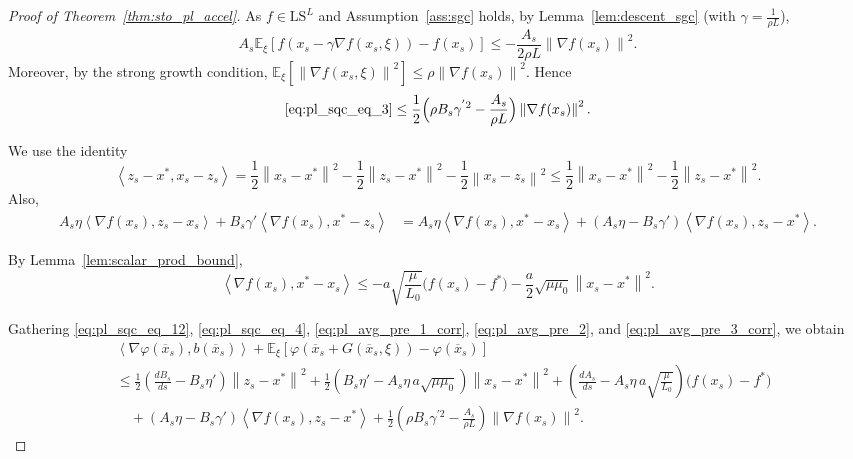 \documentclass{article}
\newcommand{\bpar}[1]{\left(#1\right)}
\newcommand{\norm}[1]{\left\lVert#1\right\rVert}
\newcommand{\dotprod}[1]{\left< #1\right>}
\newcommand{\ls}{\text{LS}^{L}}
\theoremstyle{plain}
\theoremstyle{definition}
\theoremstyle{remark}
\begin{document}
\begin{proof}[Proof of Theorem~\ref{thm:sto_pl_accel}]
As $f \in \ls$ and Assumption~\ref{ass:sgc} holds, by Lemma~\ref{lem:descent_sgc} (with $\gamma=\frac{1}{\rho L}$),
\[
A_s\mathbb{E}_{\xi}\!\left[f(x_s - \gamma \nabla f(x_s,\xi)) - f(x_s)\right]
\le -\frac{A_s}{2\rho L}\norm{\nabla f(x_s)}^2.
\]
Moreover, by the strong growth condition,
$\mathbb{E}_{\xi}\!\left[\norm{\nabla f(x_s,\xi)}^2\right]\le \rho \norm{\nabla f(x_s)}^2$. Hence
\begin{equation}\label{eq:pl_avg_pre_1_corr}
\eqref{eq:pl_sqc_eq_3}
\le \frac{1}{2}\Bigl(\rho B_s \gamma^{'2} - \frac{A_s}{\rho L}\Bigr)\norm{\nabla f(x_s)}^2.
\end{equation}

We use the identity
\begin{equation}\label{eq:pl_avg_pre_2}
\dotprod{z_s-x^\ast,x_s - z_s}
= \frac{1}{2}\norm{x_s-x^\ast}^2 -\frac{1}{2}\norm{z_s-x^\ast}^2-\frac{1}{2}\norm{x_s-z_s}^2
\le\frac{1}{2}\norm{x_s-x^\ast}^2 -\frac{1}{2}\norm{z_s-x^\ast}^2.
\end{equation}
Also,
\begin{align}\label{eq:pl_avg_pre_3_corr}
A_s \eta \dotprod{ \nabla f(x_s) ,z_s-x_s} +  B_s\gamma' \dotprod{\nabla f(x_s),x^\ast - z_s}
&= A_s \eta \dotprod{ \nabla f(x_s) ,x^\ast-x_s}
+ \bpar{A_s\eta - B_s \gamma'} \dotprod{ \nabla f(x_s) ,z_s-x^\ast}.
\end{align}

By Lemma~\ref{lem:scalar_prod_bound},
\[
\dotprod{ \nabla f(x_s) ,x^\ast-x_s}
\le  -a \sqrt{\frac{\mu}{L_0}}\bigl(f(x_s)-f^\ast\bigr)
      - \frac{a}{2}\sqrt{\mu\mu_0}\norm{x_s-x^\ast}^2.
\]

Gathering \eqref{eq:pl_sqc_eq_12}, \eqref{eq:pl_sqc_eq_4}, \eqref{eq:pl_avg_pre_1_corr}, \eqref{eq:pl_avg_pre_2},
and \eqref{eq:pl_avg_pre_3_corr}, we obtain
\begin{align*}
&\dotprod{\nabla \varphi(\overline{x}_s),b(\overline{x}_s)}
+ \mathbb{E}_{\xi}\!\left[\varphi(\overline{x}_s+ G(\overline{x}_s,\xi)) - \varphi(\overline{x}_s)\right] \\
&\le \frac{1}{2}\bpar{ \frac{dB_s}{ds}-B_s \eta'}\norm{z_s-x^\ast}^2
+  \frac{1}{2}\bpar{  B_s \eta' - A_s \eta\,a \sqrt{\mu\mu_0}}\norm{x_s-x^\ast}^2
+ \bpar{\frac{dA_s}{ds}- A_s \eta\,a \sqrt{\frac{\mu}{L_0}}}\bigl(f(x_s)-f^\ast\bigr)\\
&\quad + \bpar{A_s\eta - B_s \gamma'} \dotprod{ \nabla f(x_s) ,z_s-x^\ast}
+ \frac{1}{2}\bpar{\rho B_s \gamma^{'2} - \frac{A_s}{\rho L}}\norm{\nabla f(x_s)}^2.
\end{align*}


\end{proof}
\end{document}
